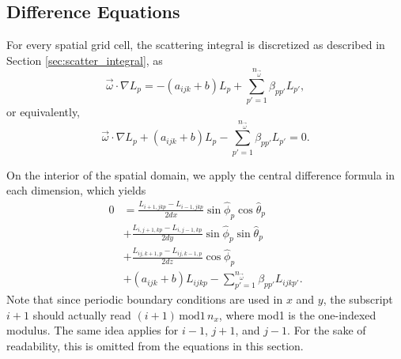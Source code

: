 \subsection{Difference Equations}
\label{sec:difference_equations}

For every spatial grid cell, the scattering integral is discretized as described in Section \ref{sec:scatter_integral}, as
\begin{equation*}
  \vec{\omega} \cdot \nabla L_p = -(a_{ijk}+b) L_p + \sum_{p'=1}^{n_{\vec{\omega}}} \beta_{pp'}L_{p'},
\end{equation*}
or equivalently,
\begin{equation*}
  \vec{\omega} \cdot \nabla L_p + (a_{ijk}+b)L_p - \sum_{p'=1}^{n_{\vec{\omega}}} \beta_{pp'} L_{p'} = 0.
\end{equation*}

On the interior of the spatial domain, we apply the central difference formula in each dimension, which yields
\begin{equation*}
  \begin{aligned}
    0 &= \frac{L_{i+1,jkp}-L_{i-1,jkp}}{2dx}\sin\hat{\phi}_p\cos\hat{\theta}_p \\
    &+ \frac{L_{i,j+1,kp}-L_{i,j-1,kp}}{2dy}\sin\hat{\phi}_p\sin\hat{\theta}_p \\
    &+ \frac{L_{ij,k+1,p}-L_{ij,k-1,p}}{2dz}\cos\hat{\phi}_p \\
    &+ (a_{ijk}+b)L_{ijkp}  - \sum_{p'=1}^{n_{\vec{\omega}}} \beta_{pp'} L_{ijkp'}.
  \end{aligned}
\end{equation*}
Note that since periodic boundary conditions are used in $x$ and $y$,
the subscript $i+1$ should actually read $(i+1) \, \mbox{mod1}\,  n_x$, where
mod1 is the one-indexed modulus.
The same idea applies for $i-1$, $j+1$, and $j-1$.
For the sake of readability, this is omitted from the equations in this section.

